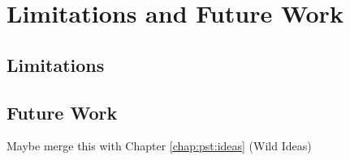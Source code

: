 
\chapter[Limitations and Future Work]{Limitations and Future Work}\label{chap:limitations_future_work}


\section{Limitations}


\section{Future Work}

Maybe merge this with Chapter \ref{chap:pst:ideas} (Wild Ideas)



